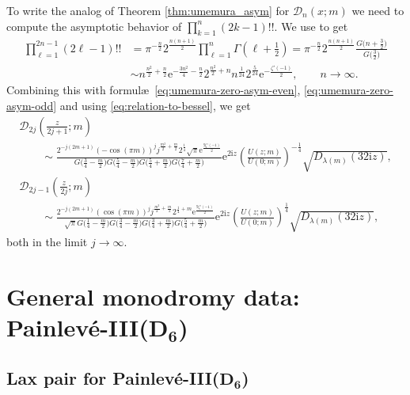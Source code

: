 \documentclass[pdftex]{sigma}
\numberwithin{equation}{section}
\newcommand{\ee}{\mathrm{e}}
\newcommand{\ii}{\mathrm{i}}
\newcommand\lb{\left(}
\newcommand\rb{\right)}
\begin{document}
To write the analog of Theorem \ref{thm:umemura_asym} for $\boldsymbol{\mathscr{D}}_n(x;m)$ we need to compute the asymptotic behavior of $\prod_{k=1}^{n}(2k-1)!!$. We use \cite[equation~(5.4.2)]{DLMF} to get
\begin{align*}
\prod_{\ell=1}^{2n-1}(2\ell-1)!!&= \pi^{-\frac{n}{2}}2^{\frac{n(n+1)}{2}}\prod_{\ell=1}^n\Gamma\left(\ell+\frac12\right)=\pi^{-\frac{n}{2}}2^{\frac{n(n+1)}{2}}\frac{G\big(n+\frac32\big)}{G\big(\frac32\big)}\\
&\sim n^{\frac{n^2}{2}+\frac{n}{2}}\ee^{-\frac{3n^2}{4}-\frac{n}{2}}2^{\frac{n^2}{2}+n}n^\frac{1}{24}2^{\frac{5}{24}}\ee^{-\frac{\zeta'(-1)}{2}},\qquad n\to\infty.
\end{align*}
Combining this with formul\ae\ \eqref{eq:umemura-zero-asym-even}, \eqref{eq:umemura-zero-asym-odd} and using \eqref{eq:relation-to-bessel}, we get
\begin{gather*}
\boldsymbol{\mathscr{D}}_{2j}\left(\frac{z}{2j+1};m\right) \\
\qquad\sim\frac{2^{-j(2m+1)}(-\cos(\pi m))^jj^{\frac{m^2}{2}+\frac{m}{2}}2^{\frac{1}{4}}\sqrt{\pi}\ee^{\frac{9\zeta'(-1)}{2}}}{G\big(\frac{3}{4}-\frac{m}{2}\big)G\big(\frac{5}{4}-\frac{m}{2}\big)G\big(\frac{5}{4}+\frac{m}{2}\big)G\big(\frac{7}{4}+\frac{m}{2}\big)}\ee^{2\ii z}\left(\frac{U(z;m)}{U(0;m)}\right)^{-\frac{1}{4}} \sqrt{D_{\lambda(m)}\lb 32\ii z\rb},\\
\boldsymbol{\mathscr{D}}_{2j-1}\left(\frac{z}{2j};m\right) \\
\qquad\sim\frac{2^{-j(2m+1)}(\cos(\pi m))^jj^{\frac{m^2}{2}+\frac{m}{2}}2^{\frac{1}{4}+m}\ee^{\frac{9\zeta'(-1)}{2}}}{\sqrt{\pi}G\big(\frac{1}{4}-\frac{m}{2}\big)G\big(\frac{3}{4}-\frac{m}{2}\big)G\big(\frac{3}{4}+\frac{m}{2}\big)G\big(\frac{5}{4}+\frac{m}{2}\big)}\ee^{2\ii z}\left(\frac{U(z;m)}{U(0;m)}\right)^{\frac{1}{4}} \sqrt{D_{\lambda(m)}\lb 32\ii z\rb},
\end{gather*}
both in the limit $j\to\infty$.
\section[General monodromy data: Painleve-III(D\_6)]{General monodromy data: Painlev\'e-III($\boldsymbol{D_6}$)}
\label{sec:monodromy-rep-$D_6$}

\subsection[Lax pair for Painleve-III(D\_6)]{Lax pair for Painlev\'e-III($\boldsymbol{D_6}$)}
\label{sec:lax-pair-$D_6$}
\end{document}
